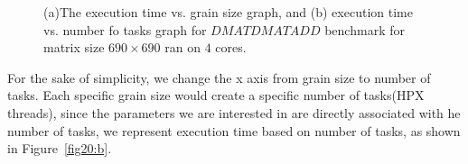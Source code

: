 \vspace{\baselineskip}	
\begin{figure}[H]
	\centering
	\caption{(a)The execution time vs. grain size graph, and (b) execution time vs. number fo tasks graph for $DMATDMATADD$ benchmark for matrix size $690\times690$ ran on $4$ cores.}	
	\label{fig21}
\end{figure}

\vspace{\baselineskip}	
For the sake of simplicity, we change the x axis from grain size to number of tasks. Each specific grain size would create a specific number of tasks(HPX threads), since the parameters we are interested in are directly associated with he number of tasks, we represent execution time based on number of tasks, as shown in Figure~\ref{fig20:b}.
 

